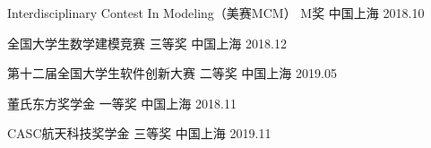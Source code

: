 
\begin{cvhonors}

  \cvhonor
    {Interdisciplinary Contest In Modeling（美赛MCM）} %
    {M奖} %
    {中国上海} %
    {2018.10} %

  \cvhonor
    {全国大学生数学建模竞赛} %
    {三等奖} %
    {中国上海} %
    {2018.12} %

  \cvhonor
    {第十二届全国大学生软件创新大赛} %
    {二等奖} %
    {中国上海} %
    {2019.05} %

  \cvhonor
    {董氏东方奖学金} %
    {一等奖} %
    {中国上海} %
    {2018.11} %

  \cvhonor
    {CASC航天科技奖学金} %
    {三等奖} %
    {中国上海} %
    {2019.11} %

\end{cvhonors}
